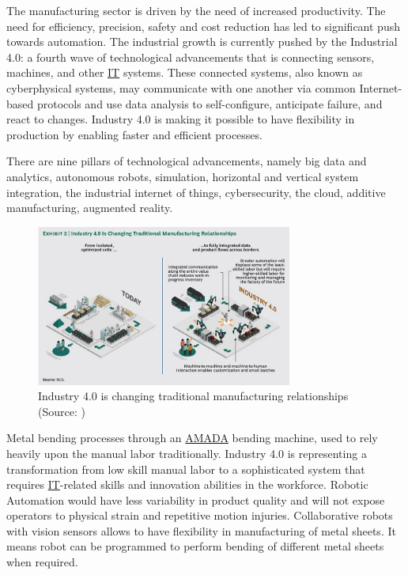 The manufacturing sector is driven by the need of increased productivity. The need
for efficiency, precision, safety and cost reduction has led to significant push towards
automation. The industrial growth is currently pushed by the Industrial 4.0: a fourth wave
of technological advancements that is connecting sensors, machines, and other
\hyperref[tab:acronyms]{IT} systems. These connected systems, also known as cyberphysical systems, may communicate with one 
another via common Internet-based protocols and use data analysis to self-configure, anticipate 
failure, and react to changes. Industry 4.0 is making it possible to have
flexibility in production by enabling faster and efficient processes. \cite{BAI2020107776,russmann2015industry}

There are nine pillars of technological advancements, namely big data and analytics, autonomous robots, simulation,
horizontal and vertical system integration, the industrial internet of things,
cybersecurity, the cloud, additive manufacturing, augmented reality. \cite{russmann2015industry}


\begin{figure}[h]
    \centering
    \includegraphics[width=0.75\textwidth]{1. Introduction/1.1 Background/exhibit2.png}
    \caption{Industry 4.0 is changing traditional manufacturing relationships (Source: \cite{russmann2015industry})}
    \label{fig:background-exhibit-2}
\end{figure}

Metal bending processes through an \hyperref[tab:acronyms]{AMADA} bending machine, used to rely heavily upon the
manual labor traditionally. Industry 4.0 is representing a transformation
from low skill manual labor to a sophisticated system that requires \hyperref[tab:acronyms]{IT}-related skills
and innovation abilities in the workforce. Robotic Automation would have less variability in product
quality and will not expose operators to physical strain and repetitive motion injuries. Collaborative robots
with vision sensors \cite{8361333} allows to have flexibility in manufacturing of metal sheets.
It means robot can be programmed to perform bending of different metal sheets when required. \cite{kassowrobotsblog}
